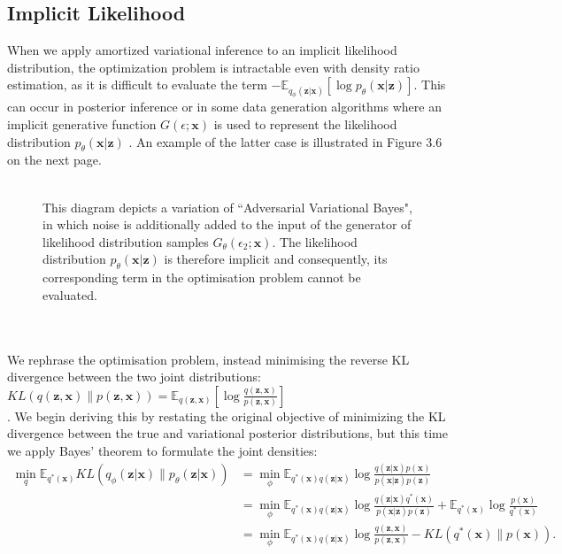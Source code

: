 \documentclass[honours,12pt]{unswthesis}
\newcommand{\E}{\mathbb{E}}
\numberwithin{equation}{section}
\theoremstyle{definition}
\begin{document}
\subsection{Implicit Likelihood}
When we apply amortized variational inference to an implicit likelihood distribution, the optimization problem is intractable even with density ratio estimation, as it is difficult to evaluate the term $-\E_{q_\phi(\bm{z}|\bm{x})}[\log p_\theta(\bm{x}|\bm{z})]$. This can occur in posterior inference or in some data generation algorithms where an implicit generative function $G(\epsilon;\bm{x})$ is used to represent the likelihood distribution $p_\theta(\bm{x}|\bm{z})$ \citep{ali}. An example of the latter case is illustrated in Figure 3.6 on the next page. \\
\\
\begin{figure}[h]
  \centering
   \caption{\small This diagram depicts a variation of ``Adversarial Variational Bayes", in which noise is additionally added to the input of the generator of likelihood distribution samples $G_\theta(\epsilon_2;\bm{x})$. The likelihood distribution $p_\theta(\bm{x}|\bm{z})$ is therefore implicit and consequently, its corresponding term in the optimisation problem cannot be evaluated.}
\end{figure}\\
\\
We rephrase the optimisation problem, instead minimising the reverse KL divergence between the two joint distributions: $KL(q(\bm{z},\bm{x})\|p(\bm{z},\bm{x}))=\E_{q(\bm{z},\bm{x})}\left[\log\frac{q(\bm{z},\bm{x})}{p(\bm{z},\bm{x})}\right]$\\\citep{tran}. We begin deriving this by restating the original objective of minimizing the KL divergence between the true and variational posterior distributions, but this time we apply Bayes' theorem to formulate the joint densities:
\begin{align*}
\min_q \mathbb{E}_{q^*(\bm{x})}KL(q_\phi(\bm{z}|\bm{x})\|p_\theta (\bm{z}|\bm{x}))&=\min_\phi\mathbb{E}_{q^*(\bm{x})q(\bm{z}|\bm{x})}\log \frac{q(\bm{z}|\bm{x})p(\bm{x})}{p(\bm{x}|\bm{z})p(\bm{z})}\\
&=\min_\phi\mathbb{E}_{q^*(\bm{x})q(\bm{z}|\bm{x})}\log \frac{q(\bm{z}|\bm{x})q^*(\bm{x})}{p(\bm{x}|\bm{z})p(\bm{z})}+\mathbb{E}_{q^*(\bm{x})}\log \frac{p(\bm{x})}{q^*(\bm{x})}\\
&= \min_\phi\mathbb{E}_{q^*(\bm{x})q(\bm{z}|\bm{x})}\log \frac{q(\bm{z},\bm{x})}{p(\bm{z},\bm{x})}-KL(q^*(\bm{x})\|p(\bm{x})).
\end{align*}
\end{document}
